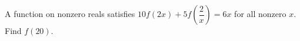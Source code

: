A function on nonzero reals satisfies $10f(2x)+5f(\dfrac{2}{x})=6x$ for all nonzero $x$. Find $f(20)$.

